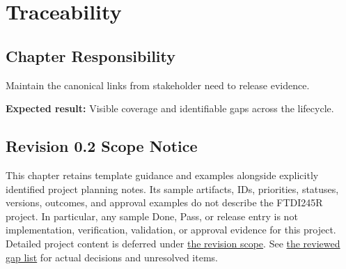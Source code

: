 \chapter{Traceability}
\section{Chapter Responsibility}
\label{Section:TraceabilityResponsibility}
Maintain the canonical links from stakeholder need to release evidence.

\noindent\textbf{Expected result:} Visible coverage and identifiable gaps across the lifecycle.

\section{Revision 0.2 Scope Notice}
\label{Section:DeferredTraceability}
\begin{fsaNote}
This chapter retains template guidance and examples alongside explicitly
identified project planning notes.
Its sample artifacts, IDs, priorities, statuses, versions, outcomes, and
approval examples do not describe the FTDI245R project. In particular, any
sample Done, Pass, or release entry is not implementation, verification,
validation, or approval evidence for this project. Detailed project content
is deferred under \hyperref[Section:ProjectScope]{the revision scope}.
See \hyperref[Table:ProjectGapReview]{the reviewed gap list} for actual
decisions and unresolved items.
\end{fsaNote}

